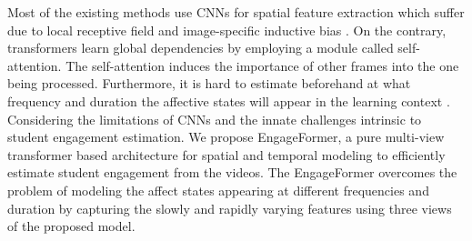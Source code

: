 Most of the existing methods use CNNs for spatial feature extraction which suffer due to local receptive field and image-specific inductive bias \cite{dosovitskiy2020image}.
 On the contrary, transformers learn global dependencies by employing a module called self-attention. The self-attention induces the importance of other frames into the one being processed. Furthermore, it is hard to estimate beforehand at what frequency and duration the affective states will appear in the learning context \cite{dewan2019engagement}. Considering the limitations of CNNs and the innate challenges intrinsic to student engagement estimation. We propose EngageFormer, a pure multi-view transformer \cite{yan2022multiview} based architecture for spatial and temporal modeling to efficiently estimate student engagement from the videos. The EngageFormer overcomes the problem of modeling the affect states appearing at different frequencies and duration by capturing the slowly and rapidly varying features using three views of the proposed model.